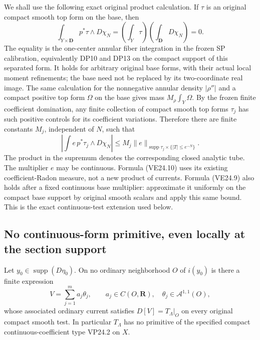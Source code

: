 We shall use the following exact original product calculation. If
\(\tau\) is an original compact smooth top form on the base, then
\[
 \int_{Y\times\mathbf D}p^*\tau\wedge D\chi_N
         =\left(\int_Y\tau\right)\left(\int_{\mathbf D}D\chi_N\right)=0.
 \tag{VE24.9}
\]
The equality is the one-center annular fiber integration in the
frozen SP calibration, equivalently DP10 and DP13 on the compact
support of this separated form. It holds for arbitrary original
base forms, with their actual local moment refinements; the base
need not be replaced by its two-coordinate real image. The same
calculation for the nonnegative annular density \(|\rho''|\)
and a compact positive top form \(\Omega\) on the base gives
mass \(M_\rho\int_Y\Omega\). By the frozen finite coefficient
domination, any finite collection of compact smooth top forms
\(\tau_j\) has such positive controls for its coefficient
variations. Therefore there are finite constants \(M_j\),
independent of \(N\), such that
\[
 \left|\int e\,p^*\tau_j\wedge D\chi_N\right|
       \le M_j\|e\|_{\operatorname{supp}\tau_j\times\{|T|\le e^{-N}\}}.
 \tag{VE24.10}
\]
The product in the supremum denotes the corresponding closed
analytic tube. The multiplier \(e\) may be continuous. Formula
(VE24.10) uses its existing coefficient-Radon measure, not a new
product of currents. Formula (VE24.9) also holds after a fixed
continuous base multiplier: approximate it uniformly on the
compact base support by original smooth scalars and apply this
same bound. This is the exact continuous-test extension used below.

\subsection{No continuous-form primitive, even locally at the section support}

\begin{proposition}
Let \(y_0\in\operatorname{supp}(D\eta_0)\). On no ordinary
neighborhood \(O\) of \(i(y_0)\) is there a finite expression
\[
                 V=\sum_{j=1}^m a_j\theta_j,
 \qquad a_j\in C(O,\mathbf R),\quad
       \theta_j\in\mathcal A^{1,1}(O),
 \tag{VE24.11}
\]
whose associated ordinary current satisfies
\(D[V]=T_\Lambda|_O\) on every original compact smooth test.
In particular \(T_\Lambda\) has no primitive of the specified
compact continuous-coefficient type VP24.2 on \(X\).
\end{proposition}

